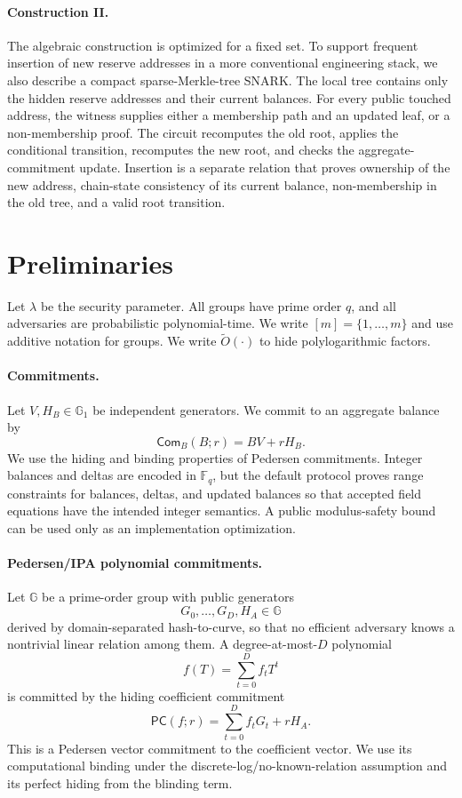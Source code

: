 \documentclass[runningheads]{llncs}
\newcommand{\F}{\mathbb{F}}
\newcommand{\G}{\mathbb{G}}
\newcommand{\Com}{\mathsf{Com}}
\newcommand{\PC}{\mathsf{PC}}
\newcommand{\softO}{\widetilde{O}}
\begin{document}
\paragraph{Construction II.}
The algebraic construction is optimized for a fixed set.  To support frequent insertion of new reserve addresses in a more conventional engineering stack, we also describe a compact sparse-Merkle-tree SNARK.  The local tree contains only the hidden reserve addresses and their current balances.  For every public touched address, the witness supplies either a membership path and an updated leaf, or a non-membership proof.  The circuit recomputes the old root, applies the conditional transition, recomputes the new root, and checks the aggregate-commitment update.  Insertion is a separate relation that proves ownership of the new address, chain-state consistency of its current balance, non-membership in the old tree, and a valid root transition.

\section{Preliminaries}

Let \(\lambda\) be the security parameter.  All groups have prime order \(q\), and all adversaries are probabilistic polynomial-time.  We write \([m]=\{1,\ldots,m\}\) and use additive notation for groups.  We write \(\softO(\cdot)\) to hide polylogarithmic factors.

\paragraph{Commitments.}
Let \(V,H_B\in\G_1\) be independent generators.  We commit to an aggregate balance by
\[
        \Com_B(B;r)=B V+rH_B.
\]
We use the hiding and binding properties of Pedersen commitments.  Integer balances and deltas are encoded in \(\F_q\), but the default protocol proves range constraints for balances, deltas, and updated balances so that accepted field equations have the intended integer semantics.  A public modulus-safety bound can be used only as an implementation optimization.

\paragraph{Pedersen/IPA polynomial commitments.}
Let \(\G\) be a prime-order group with public generators
\[
        G_0,\ldots,G_D,H_A\in\G
\]
derived by domain-separated hash-to-curve, so that no efficient adversary knows a nontrivial linear relation among them.  A degree-at-most-\(D\) polynomial
\[
        f(T)=\sum_{t=0}^D f_tT^t
\]
is committed by the hiding coefficient commitment
\[
        \PC(f;r)=\sum_{t=0}^Df_tG_t+rH_A .
\]
This is a Pedersen vector commitment to the coefficient vector.  We use its computational binding under the discrete-log/no-known-relation assumption and its perfect hiding from the blinding term.
\end{document}
